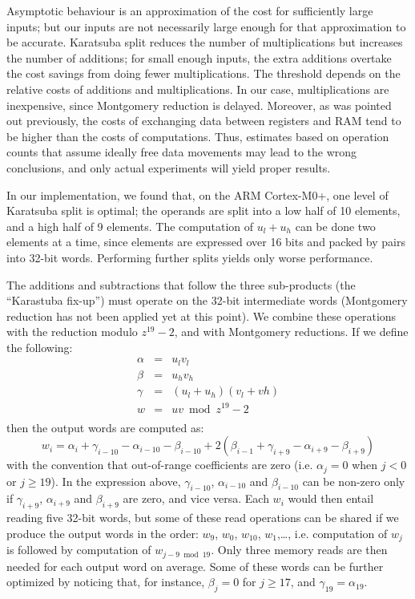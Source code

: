 \documentclass{llncs}
\begin{document}
Asymptotic behaviour is an approximation of the cost for sufficiently
large inputs; but our inputs are not necessarily large enough for that
approximation to be accurate. Karatsuba split reduces the number of
multiplications but increases the number of additions; for small enough
inputs, the extra additions overtake the cost savings from doing fewer
multiplications. The threshold depends on the relative costs of
additions and multiplications. In our case, multiplications are
inexpensive, since Montgomery reduction is delayed. Moreover, as was
pointed out previously, the costs of exchanging data between registers
and RAM tend to be higher than the costs of computations. Thus,
estimates based on operation counts that assume ideally free data
movements may lead to the wrong conclusions, and only actual experiments
will yield proper results.

In our implementation, we found that, on the ARM Cortex-M0+, one level
of Karatsuba split is optimal; the operands are split into a low
half of 10 elements, and a high half of 9 elements. The computation
of $u_l+u_h$ can be done two elements at a time, since elements are
expressed over 16 bits and packed by pairs into 32-bit words. Performing
further splits yields only worse performance.

The additions and subtractions that follow the three sub-products (the
``Karastuba fix-up'') must operate on the 32-bit intermediate words
(Montgomery reduction has not been applied yet at this point). We
combine these operations with the reduction modulo $z^{19}-2$, and with
Montgomery reductions. If we define the following:
\begin{eqnarray*}
    \alpha &=& u_l v_l \\
     \beta &=& u_h v_h \\
    \gamma &=& (u_l+u_h)(v_l+vh) \\
         w &=& uv \bmod z^{19}-2 \\
\end{eqnarray*}
then the output words are computed as:
\begin{equation*}
    w_i = \alpha_i + \gamma_{i-10} - \alpha_{i-10} - \beta_{i-10}
          + 2 (\beta_{i-1} + \gamma_{i+9} - \alpha_{i+9} - \beta_{i+9})
\end{equation*}
with the convention that out-of-range coefficients are zero (i.e.
$\alpha_j = 0$ when $j < 0$ or $j \geq 19$). In the expression above,
$\gamma_{i-10}$, $\alpha_{i-10}$ and $\beta_{i-10}$ can be non-zero
only if $\gamma_{i+9}$, $\alpha_{i+9}$ and $\beta_{i+9}$ are zero, and
vice versa. Each $w_i$ would then entail reading five 32-bit words, but
some of these read operations can be shared if we produce the output
words in the order: $w_9$, $w_0$, $w_{10}$, $w_1$,\ldots, i.e. computation
of $w_j$ is followed by computation of $w_{j-9 \bmod 19}$. Only three
memory reads are then needed for each output word on average. Some of
these words can be further optimized by noticing that, for instance,
$\beta_j = 0$ for $j \geq 17$, and $\gamma_{19} = \alpha_{19}$.
\end{document}
